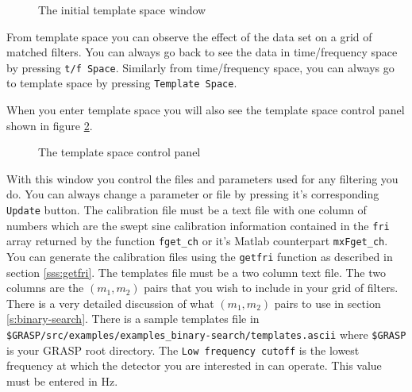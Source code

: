 \begin{figure}[h]
\begin{center}
\caption{ \label{f:tmplt_startup}
The initial template space window}
\end{center}
\end{figure}

From template space you can observe the effect of the data set on a grid of
matched filters. You can always go back to see the data in time/frequency
space by pressing \texttt{t/f Space}. Similarly from time/frequency space, you
can always go to template space by pressing \texttt{Template Space}.

When you enter template space you will also see the template space control
panel shown in figure \ref{f:tmplt_control}.
\begin{figure}[h]
\begin{center}
\caption{ \label{f:tmplt_control}
The template space control panel}
\end{center}
\end{figure}

With this window you control the files and parameters used for any filtering
you do. You can always change a parameter or file by pressing it's
corresponding \texttt{Update} button. The calibration file must be a text file
with one column of numbers which are the swept sine calibration information
contained in the \texttt{fri} array returned by the function
\texttt{fget\_ch} or it's Matlab counterpart \texttt{mxFget\_ch}. You can
generate the calibration files using the \texttt{getfri} function as described
in section \ref{sss:getfri}. The templates file must be a two column text file.
The two columns are the $\left(  m_{1},m_{2}\right)  $ pairs that you wish to
include in your grid of filters. There is a very detailed discussion of what
$\left(  m_{1},m_{2}\right)  $ pairs to use in section \ref{s:binary-search}.
There is a sample templates file in 
\texttt{\$GRASP/src/examples/examples\_binary-search/templates.ascii} where
\texttt{\$GRASP} is your GRASP root directory. The \texttt{Low frequency
cutoff} is the lowest frequency at which the detector you are interested in
can operate. This value must be entered in Hz.

